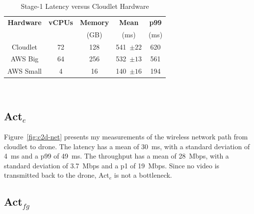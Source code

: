 \begin{table}
\centering
    \begin{tabular}{|c|c|c|c|c|}
    \hline
        \textbf{Hardware} & \textbf{vCPUs} & \textbf{Memory} &\textbf{Mean} &\textbf{p99}\\ & & {(GB)} & {(ms)} & {(ms)} \\
    \hline
        Cloudlet & 72 & 128 & 541~$\pm22$ & 620\\
        AWS Big & 64 & 256 &532~$\pm13$ & 561 \\
        AWS Small & 4 &  16 & 140~$\pm16$ & 194\\
    \hline
    \end{tabular}\\
\caption{Stage-1 Latency versus Cloudlet Hardware}
\label{fig:hwdependence}
\end{table}

\subsection{Act$_e$}
\label{sec:netuplink}

Figure~\ref{fig:c2d-net} presents my measurements of the wireless
network path from cloudlet to drone.  The latency has a mean of 30~ms,
with a standard deviation of 4~ms and a p99 of 49~ms.  The throughput
has a mean of 28~Mbps, with a standard deviation of 3.7~Mbps and a p1
of 19~Mbps.  Since no video is transmitted back to the drone, Act$_e$
is not a bottleneck.

\subsection{Act$_{fg}$}
\label{sec:c2d-drone}

\begingroup
\setlength{\columnsep}{4pt}


